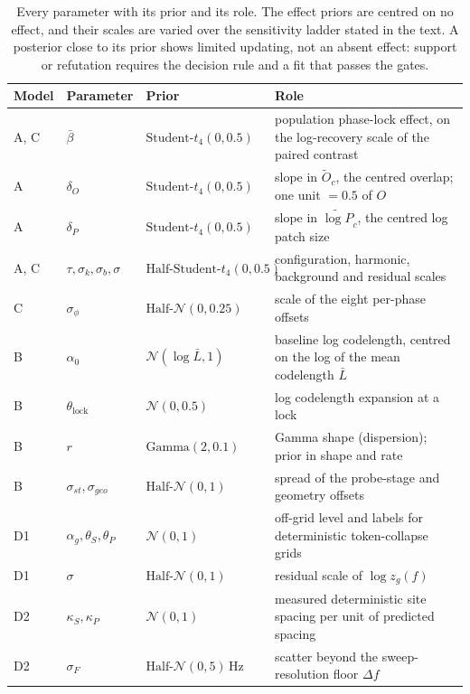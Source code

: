 \begin{table}[p]
    \centering
\small
    \begin{tabular}{@{}lllM{4.9cm}@{}}
        \toprule
        \textbf{Model} & \textbf{Parameter} & \textbf{Prior} & \textbf{Role} \\
        \midrule
        A, C & $\bar\beta$                     & $\text{Student-}t_4(0,0.5)$      & population phase-lock effect, on the log-recovery scale of the paired contrast \\
        \rowsep%
        A    & $\delta_O$                      & $\text{Student-}t_4(0,0.5)$      & slope in $\widetilde O_c$, the centred overlap; one unit $=0.5$ of $O$ \\
        \rowsep%
        A    & $\delta_P$                      & $\text{Student-}t_4(0,0.5)$      & slope in $\widetilde{\log P}_c$, the centred log patch size \\
        \rowsep%
        A, C & $\tau,\sigma_k,\sigma_b,\sigma$ & $\text{Half-Student-}t_4(0,0.5)$ & configuration, harmonic, background and residual scales \\
        \rowsep%
        C    & $\sigma_\phi$                   & $\text{Half-}\mathcal N(0,0.25)$ & scale of the eight per-phase offsets \\
        \midrule
        B    & $\alpha_0$                      & $\mathcal N(\log \bar L, 1)$     & baseline log codelength, centred on the log of the mean codelength $\bar L$ \\
        \rowsep%
        B    & $\theta_{\mathrm{lock}}$        & $\mathcal N(0,0.5)$              & log codelength expansion at a lock \\
        \rowsep%
        B    & $r$                             & $\text{Gamma}(2,0.1)$            & Gamma shape (dispersion); prior in shape and rate \\
        \rowsep%
        B    & $\sigma_{st},\sigma_{geo}$      & $\text{Half-}\mathcal N(0,1)$    & spread of the probe-stage and geometry offsets \\
        \midrule
        D1   & $\alpha_g,\theta_S,\theta_P$    & $\mathcal N(0,1)$                & off-grid level and labels for deterministic token-collapse grids \\
        \rowsep%
        D1   & $\sigma$                        & $\text{Half-}\mathcal N(0,1)$    & residual scale of $\log z_g(f)$ \\
        \midrule
        D2   & $\kappa_S,\kappa_P$             & $\mathcal N(0,1)$                & measured deterministic site spacing per unit of predicted spacing \\
        \rowsep%
        D2   & $\sigma_F$                      & $\text{Half-}\mathcal N(0,5)$\,Hz & scatter beyond the sweep-resolution floor $\Delta f$ \\
        \bottomrule
    \end{tabular}
\caption{Every parameter with its prior and its role. The effect priors are centred on no effect, and their scales are varied over the sensitivity ladder stated in the text. A posterior close to its prior shows limited updating, not an absent effect: support or refutation requires the decision rule and a fit that passes the gates.}%
    \label{tab:bayesPriors}
\end{table}
